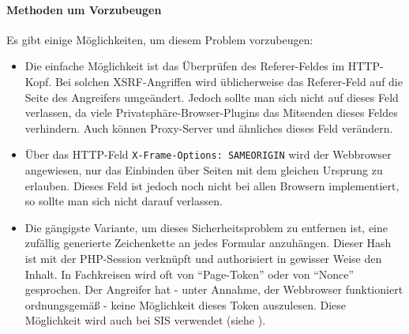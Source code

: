 \paragraph{Methoden um Vorzubeugen\\}
Es gibt einige Möglichkeiten, um diesem Problem vorzubeugen:
\begin{itemize}
	\item Die einfache Möglichkeit ist das Überprüfen des Referer-Feldes im HTTP-Kopf. Bei solchen XSRF-Angriffen wird üblicherweise das Referer-Feld auf die Seite des Angreifers umgeändert. Jedoch sollte man sich nicht auf dieses Feld verlassen, da viele Privatsphäre-Browser-Plugins  das Mitsenden dieses Feldes verhindern. Auch können Proxy-Server und ähnliches dieses Feld verändern.
	\item Über das HTTP-Feld \texttt{X-Frame-Options: SAMEORIGIN} wird der Webbrowser angewiesen, nur das Einbinden über Seiten mit dem gleichen Ursprung zu erlauben. Dieses Feld ist jedoch noch nicht bei allen Browsern implementiert, so sollte man sich nicht darauf verlassen.
	\item Die gängigste Variante, um dieses Sicherheitsproblem zu entfernen ist, eine zufällig generierte Zeichenkette an jedes Formular anzuhängen. Dieser Hash ist mit der PHP-Session verknüpft und authorisiert in gewisser Weise den Inhalt. In Fachkreisen wird oft von \enquote{Page-Token} oder von \enquote{Nonce} gesprochen. Der Angreifer hat - unter Annahme, der Webbrowser funktioniert ordnungsgemäß - keine Möglichkeit dieses Token auszulesen. Diese Möglichkeit wird auch bei SIS verwendet (siehe ).
\end{itemize}
